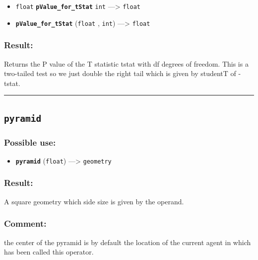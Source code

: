 \documentclass[]{book}
\providecommand{\tightlist}{%
  \setlength{\itemsep}{0pt}\setlength{\parskip}{0pt}}
\theoremstyle{definition}
\theoremstyle{definition}
\theoremstyle{definition}
\theoremstyle{remark}
\begin{document}
\begin{itemize}
\tightlist
\item
  \texttt{float} \textbf{\texttt{pValue\_for\_tStat}} \texttt{int}
  ---\textgreater{} \texttt{float}
\item
  \textbf{\texttt{pValue\_for\_tStat}} (\texttt{float} , \texttt{int})
  ---\textgreater{} \texttt{float}
\end{itemize}

\subsubsection{Result:}\label{result-408}

Returns the P value of the T statistic tstat with df degrees of freedom.
This is a two-tailed test so we just double the right tail which is
given by studentT of -\textbar{}tstat\textbar{}.

\begin{center}\rule{0.5\linewidth}{\linethickness}\end{center}

\subsection{\texorpdfstring{\texttt{pyramid}}{pyramid}}\label{pyramid}

\subsubsection{Possible use:}\label{possible-use-423}

\begin{itemize}
\tightlist
\item
  \textbf{\texttt{pyramid}} (\texttt{float}) ---\textgreater{}
  \texttt{geometry}
\end{itemize}

\subsubsection{Result:}\label{result-409}

A square geometry which side size is given by the operand.

\subsubsection{Comment:}\label{comment-80}

the center of the pyramid is by default the location of the current
agent in which has been called this operator.
\end{document}

